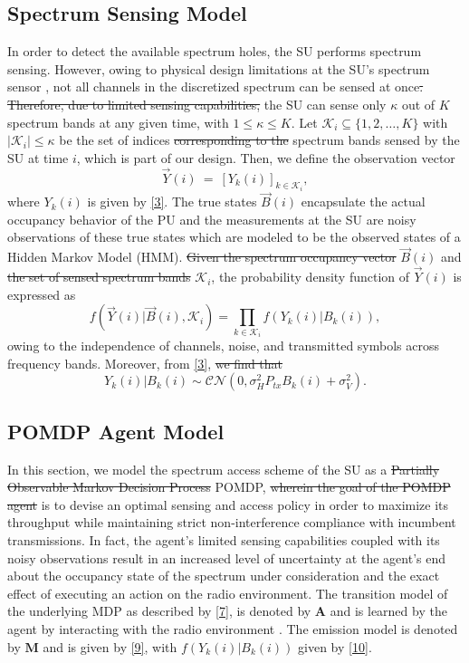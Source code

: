 \documentclass[10pt,twocolumn]{IEEEtran}
\newcommand{\sst}[1]{\st{#1}}
\newcommand{\nm}[1]{{\color{blue}\bf{[NM: #1]}}}
\newcommand{\add}[1]{{\color{red}{#1}}}
\begin{document}
\subsection{Spectrum Sensing Model}
In order to detect the available spectrum holes, the SU performs spectrum sensing. However, owing to physical design limitations at the SU's spectrum sensor \cite{5990482}, not all channels in the discretized spectrum can be sensed at once\add{, so that}\sst{. Therefore, due to limited sensing capabilities,} the SU can sense only $\kappa$ out of $K$ spectrum bands at any given time, with $1\leq \kappa\leq K$. Let $\mathcal K_{i}\subseteq\{1,2,\dots,K\}$ with $|\mathcal K_i|\leq \kappa$ be the set of indices \add{of}\sst{ corresponding to the} spectrum bands sensed by the SU at time $i$, which is part of our design.
Then, we define the observation vector
\begin{equation}\label{8}
    \vec{Y}(i)\ =\ [Y_k(i)]_{k\in\mathcal K_i},
\end{equation}
where $Y_k(i)$ is given by \eqref{3}.
The true states $\vec{B}(i)$ encapsulate the actual occupancy behavior of the PU and the measurements at the SU are noisy observations of these true states which are modeled to be the observed states of a Hidden Markov Model (HMM). 
\add{Conditional on}\sst{Given the spectrum occupancy vector} $\vec{B}(i)$ and\sst{ the set of sensed spectrum bands} $\mathcal K_i$, the probability density function of $\vec{Y}(i)$ is expressed as
\begin{equation}\label{9}
    f(\vec{Y}(i)|\vec{B}(i),\mathcal K_i)=\prod_{k\in\mathcal K_i}f(Y_k(i)|B_k(i)),
\end{equation}
owing to the independence of channels, noise, and transmitted symbols across frequency bands. Moreover, from \eqref{3},\sst{ we find that}
\begin{equation}\label{10}
 Y_k(i)|B_k(i)\sim \mathcal{CN}(0,\sigma_H^2P_{tx}B_k(i)+\sigma_V^2).
\end{equation}
\subsection{POMDP Agent Model}
In this section, we model the spectrum access scheme of the SU as a\sst{ Partially Observable Markov Decision Process} POMDP, \add{whose goal}\sst{ wherein the goal of the POMDP agent} is to devise an optimal sensing and access policy in order to maximize its throughput while maintaining strict non-interference compliance with incumbent transmissions. In fact, the agent's limited sensing capabilities coupled with its noisy observations result in an increased level of uncertainty at the agent's end about the occupancy state of the spectrum under consideration and the exact effect of executing an action on the radio environment. The transition model of the underlying MDP as described by \eqref{7}, is denoted by $\mathbf{A}$ and is learned by the agent by interacting with the radio environment \add{(see Sec. \nm{})}. The emission model is denoted by $\mathbf{M}$ and is given by \eqref{9}, with $f(Y_k(i)|B_k(i))$ given by \eqref{10}. 
\end{document}
